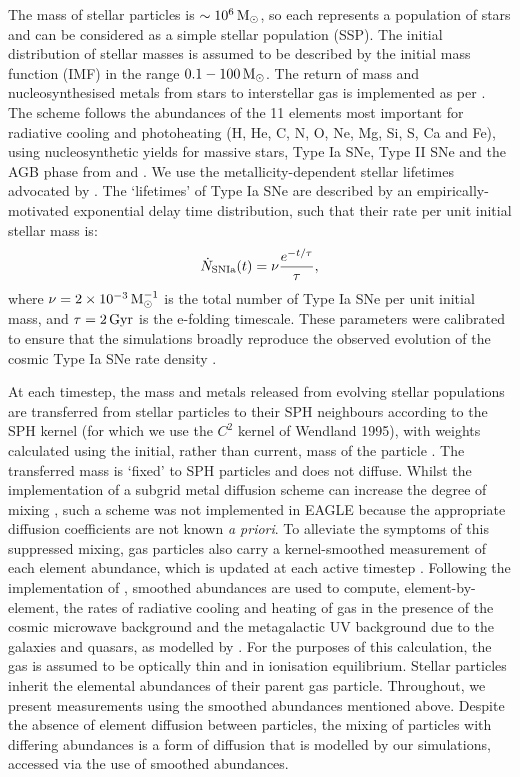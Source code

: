 The mass of stellar particles is $\sim 10^6\,{\rm M}_\odot$, so each represents a population of stars and can be considered as a simple stellar population (SSP). The initial distribution of stellar masses is assumed to be described by the \citet{2003PASP..115..763C} initial mass function (IMF) in the range $0.1-100\,{\rm M}_\odot$. The return of mass and nucleosynthesised metals from stars to interstellar gas is implemented as per \citet{2009MNRAS.399..574W}. The scheme follows the abundances of the 11 elements most important for radiative cooling and photoheating (H, He, C, N, O, Ne, Mg, Si, S, Ca and Fe), using nucleosynthetic yields for massive stars, Type Ia SNe, Type II SNe and the AGB phase from \cite{1998A&A...334..505P} and \cite{2001A&A...370..194M}. We use the metallicity-dependent stellar lifetimes advocated by \citet{1998A&A...334..505P}. The `lifetimes' of Type Ia SNe are described by an empirically-motivated exponential delay time distribution, such that their rate per unit initial stellar mass is:
\begin{equation}
\dot{N}_{\rm SNIa}(t) = \nu \frac{e^{-t/\tau}}{\tau},
\end{equation}
where $\nu = 2\times 10^{-3}\,{\rm M}_{\odot}^{-1}$ is the total number of Type Ia SNe per unit initial mass, and $\tau = 2\,{\rm Gyr}$ is the e-folding timescale. These parameters were calibrated to ensure that the simulations broadly reproduce the observed evolution of the cosmic Type Ia SNe rate density \citep{2015MNRAS.446..521S}.  

At each timestep, the mass and metals released from evolving stellar populations are transferred from stellar particles to their SPH neighbours according to the SPH kernel (for which we use the $C^2$ kernel of Wendland 1995), with weights calculated using the initial, rather than current, mass of the particle \citep[see Section 4.4 of][]{2015MNRAS.446..521S}. The transferred mass is `fixed' to SPH particles and does not diffuse. Whilst the implementation of a subgrid metal diffusion scheme can increase the degree of mixing \citep{2009MNRAS.392.1381G,2010MNRAS.407.1581S}, such a scheme was not implemented in EAGLE because the appropriate diffusion coefficients are not known \emph{a priori}. To alleviate the symptoms of this suppressed mixing, gas particles also carry a kernel-smoothed measurement of each element abundance, which is updated at each active timestep \citep[for a detailed discussion, see][]{2009MNRAS.399..574W}. Following the implementation of \citet{2009MNRAS.393...99W}, smoothed abundances are used to compute, element-by-element, the rates of radiative cooling and heating of gas in the presence of the cosmic microwave background and the metagalactic UV background due to the galaxies and quasars, as modelled by \citet{2001cghr.confE..64H}. For the purposes of this calculation, the gas is assumed to be optically thin and in ionisation equilibrium. Stellar particles inherit the elemental abundances of their parent gas particle. Throughout, we present measurements using the smoothed abundances mentioned above. Despite the absence of element diffusion between particles, the mixing of particles with differing abundances is a form of diffusion that is modelled by our simulations, accessed via the use of smoothed abundances.

